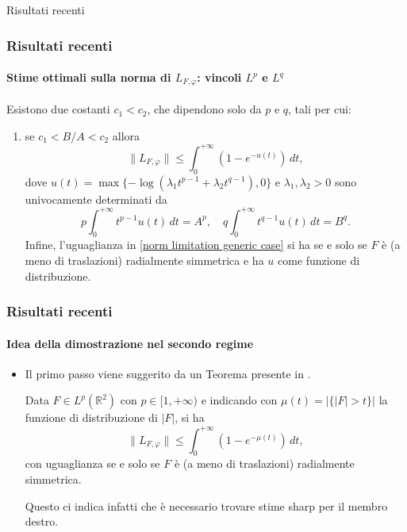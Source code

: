\documentclass[aspectratio=141]{beamer}
\newcommand\setItemnumber[1]{\setcounter{enumi}{\numexpr#1-1\relax}}
\newcommand{\R}{\mathbb{R}} %
\begin{document}
\begin{section}{Risultati recenti}
	\begin{frame}
		\frametitle{Risultati recenti}
		\framesubtitle{Stime ottimali sulla norma di $L_{F,\varphi}$: vincoli $L^p$ e $L^q$}
		\begin{myblock}[Teorema]
			Esistono due costanti $c_1 < c_2$, che dipendono solo da $p$ e $q$, tali per cui:
			\begin{enumerate}
				\setItemnumber{2}
				\item se $c_1 < B/A < c_2$ allora
				\begin{equation}\label{norm limitation generic case}
					\|L_{F,\varphi}\| \leq \int_{0}^{+\infty} (1 - e^{-u(t)})\, dt,
				\end{equation}
				dove $u(t) = \max\{-\log(\lambda_1 t^{p-1} + \lambda_2 t^{q-1}), 0\}$ e $\lambda_1, \lambda_2 > 0$ sono univocamente determinati da
				\begin{equation*}
					p \int_{0}^{+\infty} t^{p-1} u(t) \, dt = A^p, \quad q \int_{0}^{+\infty} t^{q-1} u(t) \, dt = B^q.
				\end{equation*}
				Infine, l'uguaglianza in \eqref{norm limitation generic case} si ha se e solo se $F$ è (a meno di traslazioni) radialmente simmetrica e ha $u$ come funzione di distribuzione.
			\end{enumerate}
		\end{myblock}
	\end{frame}

	\begin{frame}
		\frametitle{Risultati recenti}
		\framesubtitle{Idea della dimostrazione nel secondo regime}
		\begin{itemize}
			\item Il primo passo viene suggerito da un Teorema presente in \cite{nicolatilli_norm}.
			\begin{myblock}[Teorema]
				Data $F \in L^p(\R^2)$ con $p \in [1,+\infty)$ e indicando con $\mu(t) = |\{|F|>t\}|$ la funzione di distribuzione di $|F|$, si ha
				\begin{equation*}
					\|L_{F,\varphi}\| \leq \int_{0}^{+\infty} (1-e^{-\mu(t)}) \, dt,
				\end{equation*}
				con uguaglianza se e solo se $F$ è (a meno di traslazioni) radialmente simmetrica.
			\end{myblock}
			Questo ci indica infatti che è necessario trovare stime sharp per il membro destro.
		\end{itemize}
	\end{frame}


\end{section}
\end{document}
